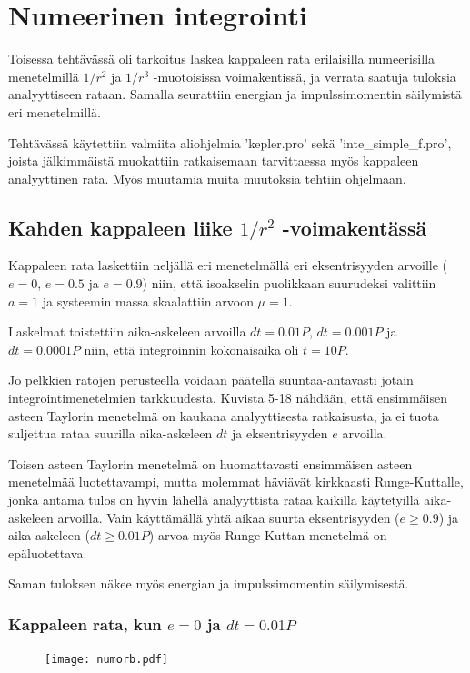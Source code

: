 \documentclass[12pt, a4paper]{article}
\begin{document}
\newpage
\section[Tehtävä 2]{Numeerinen integrointi}
Toisessa tehtävässä oli tarkoitus laskea kappaleen rata erilaisilla numeerisilla menetelmillä $1/r^2$ ja $1/r^3$ -muotoisissa voimakentissä, ja verrata saatuja tuloksia analyyttiseen rataan. Samalla seurattiin energian ja impulssimomentin säilymistä eri menetelmillä.

Tehtävässä käytettiin valmiita aliohjelmia 'kepler.pro' sekä 'inte\_simple\_f.pro', joista jälkimmäistä muokattiin ratkaisemaan tarvittaessa myös kappaleen analyyttinen rata. Myös muutamia muita muutoksia tehtiin ohjelmaan.

\subsection[Tehtävä 2a]{Kahden kappaleen liike $1/r^2$ -voimakentässä}
Kappaleen rata laskettiin neljällä eri menetelmällä eri eksentrisyyden arvoille ($e=0$, $e=0.5$ ja $e=0.9$) niin, että isoakselin puolikkaan suurudeksi valittiin $a=1$ ja systeemin massa skaalattiin arvoon $\mu=1$.

Laskelmat toistettiin aika-askeleen arvoilla $dt=0.01P$, $dt=0.001P$ ja $dt=0.0001P$ niin, että integroinnin kokonaisaika oli $t=10P$.

Jo pelkkien ratojen perusteella voidaan päätellä suuntaa-antavasti jotain integrointimenetelmien tarkkuudesta. Kuvista 5-18 nähdään, että ensimmäisen asteen Taylorin menetelmä on kaukana analyyttisesta ratkaisusta, ja ei tuota suljettua rataa suurilla aika-askeleen $dt$ ja eksentrisyyden $e$ arvoilla.

Toisen asteen Taylorin menetelmä on huomattavasti ensimmäisen asteen menetelmää luotettavampi, mutta molemmat häviävät kirkkaasti Runge-Kuttalle, jonka antama tulos on hyvin lähellä analyyttista rataa kaikilla käytetyillä aika-askeleen arvoilla. Vain käyttämällä yhtä aikaa suurta eksentrisyyden ($e \geq 0.9$) ja aika askeleen ($dt \geq 0.01P$) arvoa myös Runge-Kuttan menetelmä on epäluotettava.

Saman tuloksen näkee myös energian ja impulssimomentin säilymisestä.

\newpage
\subsubsection{Kappaleen rata, kun $e=0$ ja $dt=0.01P$}
\begin{figure}[H]
\vspace*{-1.5cm}
\texttt{[image: numorb.pdf]}%
\end{figure}
\end{document}
